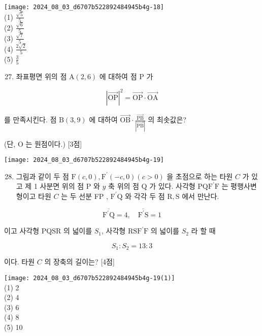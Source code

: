 \documentclass[10pt]{article}
\begin{document}
\texttt{[image: 2024\_08\_03\_d6707b522892484945b4g-18]}\\
(1) \(\frac{\sqrt{5}}{5}\)\\
(2) \(\frac{\sqrt{6}}{5}\)\\
(3) \(\frac{\sqrt{7}}{5}\)\\
(4) \(\frac{2 \sqrt{2}}{5}\)\\
(5) \(\frac{3}{5}\)

\begin{enumerate}
  \setcounter{enumi}{26}
  \item 좌표평면 위의 점 \(\mathrm{A}(2,6)\) 에 대하여 점 P 가
\end{enumerate}

\[
|\overrightarrow{\mathrm{OP}}|^{2}=\overrightarrow{\mathrm{OP}} \cdot \overrightarrow{\mathrm{OA}}
\]

를 만족시킨다. 점 \(\mathrm{B}(3,9)\) 에 대하여 \(\overrightarrow{\mathrm{OB}} \cdot \frac{\overrightarrow{\mathrm{PB}}}{|\overrightarrow{\mathrm{PB}}|}\) 의 최솟값은?

(단, O 는 원점이다.) [3점]

\begin{center}
\texttt{[image: 2024\_08\_03\_d6707b522892484945b4g-19]}
\end{center}

\begin{enumerate}
  \setcounter{enumi}{27}
  \item 그림과 같이 두 점 \(\mathrm{F}(c, 0), \mathrm{F}^{\prime}(-c, 0)(c>0)\) 을 초점으로 하는 타원 \(C\) 가 있고 제 1 사분면 위의 점 P 와 \(y\) 축 위의 점 Q 가 있다. 사각형 \(\mathrm{PQF}^{\prime} \mathrm{F}\) 는 평행사변형이고 타원 \(C\) 는 두 선분 FP , \(\mathrm{F}^{\prime} \mathrm{Q}\) 와 각각 두 점 \(\mathrm{R}, \mathrm{S}\) 에서 만난다.
\end{enumerate}

\[
\overline{\mathrm{F}^{\prime} \mathrm{Q}}=4, \quad \overline{\mathrm{F}^{\prime} \mathrm{S}}=1
\]

이고 사각형 PQSR 의 넓이를 \(S_{1}\), 사각형 \(\mathrm{RSF}^{\prime} \mathrm{F}\) 의 넓이를 \(S_{2}\) 라 할 때

\[
S_{1}: S_{2}=13: 3
\]

이다. 타원 \(C\) 의 장축의 길이는? [4점]

\texttt{[image: 2024\_08\_03\_d6707b522892484945b4g-19(1)]}\\
(1) 2\\
(2) 4\\
(3) 6\\
(4) 8\\
(5) 10
\end{document}
